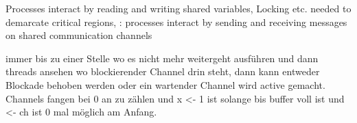 \documentclass[landscape, a4paper]{article}
\begin{document}
\begin{minipage}[t]{0.19\linewidth}
\begin{betterlist}
Processes interact by reading and writing shared variables, Locking etc. needed to demarcate critical regions, : processes interact by sending and receiving messages on shared communication channels
	\end{betterlist}
	\begin{betterlist}
		\item immer bis zu einer Stelle wo es nicht mehr weitergeht ausführen und dann threads ansehen wo blockierender Channel drin steht, dann kann entweder Blockade behoben werden oder ein wartender Channel wird active gemacht. Channels fangen bei 0 an zu zählen und x <- 1 ist solange bis buffer voll ist und <- ch ist 0 mal möglich am Anfang.

\end{betterlist}
\end{minipage}
\end{document}
